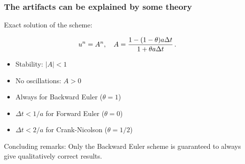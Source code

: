 \documentclass{beamer}
\newenvironment{graybox1admon}[1][]{\begin{block}{#1}}{\end{block}}
\begin{document}
\begin{frame}
\frametitle{The artifacts can be explained by some theory}

\pause
\begin{block}{}
Exact solution of the scheme:

\[ u^n = A^n,\quad A = \frac{1 - (1-\theta) a\Delta t}{1 + \theta a\Delta t}\thinspace .\]
\end{block}



\pause
\begin{block}{}
\begin{itemize}
 \item Stability: $|A| < 1$

 \item No oscillations: $A>0$

 \item Always for Backward Euler ($\theta=1$)

 \item $\Delta t < 1/a$ for Forward Euler ($\theta=0$)

 \item $\Delta t < 2/a$ for Crank-Nicolson ($\theta=1/2$)
\end{itemize}

\noindent
\end{block}



\pause
\begin{graybox1admon}[Concluding remarks:]
Only the Backward Euler scheme is guaranteed to always give
qualitatively correct results.
\end{graybox1admon}
\end{frame}
\end{document}
